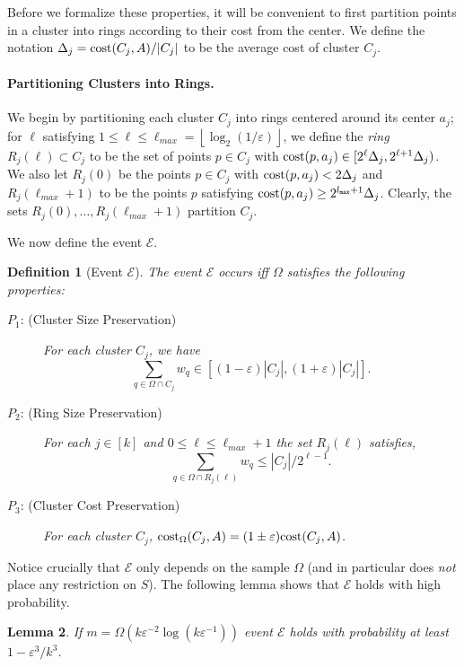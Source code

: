\documentclass[11pt]{article}
\newtheorem{lemma}{Lemma}[section]
\newtheorem{definition}[lemma]{Definition}
\theoremstyle{restate}
\theoremstyle{definition}
\newcommand{\eps}{\ensuremath{\varepsilon}}
\newcommand{\floor}[1]{{\left\lfloor{#1}\right\rfloor}}
\newcommand{\cost}{\textnormal{cost}}
\newcommand{\costom}{\cost_\Omega} %
\newcommand{\lmax}{l_\ensuremath{\textnormal{\texttt{max}}}}
\begin{document}
Before we formalize these properties, it will be convenient to first partition points in a cluster into rings according to their cost from the center. We define the notation $\Delta_j = \cost(C_j,A)/|C_j|$ to be the average cost of cluster $C_j$.

\paragraph{Partitioning Clusters into Rings.} We begin by partitioning each cluster $C_j$ into rings centered around its center $a_j$; for $\ell$ satisfying $1 \leq \ell \leq \ell_{max} =  \floor{\log_2(1/\eps)}$, we define the \textit{ring} $R_j(\ell)\subset C_j$ to be the set of points $p \in C_j$ with $\cost(p,a_j) \in [2^{\ell} \Delta_j, 2^{\ell+1} \Delta_j)$. We also let $R_j(0)$ be the points $p \in C_j$ with $\cost(p,a_j) < 2 \Delta_j$ and $R_j(\ell_{max}+1)$ to be the points $p$ satisfying $\cost(p,a_j) \geq 2^{\lmax + 1}\Delta_j$. Clearly, the sets $R_j(0), \ldots, R_j(\ell_{max} +1)$ partition $C_j$.  

We now define the event $\mathcal{E}$.
\begin{definition}[Event $\mathcal E$]
\label{def: event-E}
	The event $\mathcal E$ occurs iff $\Omega$ satisfies the following properties:
	\begin{description}
		\item[$P_1$: (Cluster Size Preservation)] \label{item: event-e-1}   For each cluster $C_j$, we have \[\sum_{q\in \Omega \cap C_j}w_q \in  [(1- \eps)|C_j|,(1+\eps)|C_j|].\]
	\item[$P_2$: (Ring Size Preservation)] \label{item: event-e-2}  For each $j \in [k]$ and $0 \leq \ell \leq \ell_{max}+1$ the set $R_j(\ell)$ satisfies, \[\sum_{q\in \Omega \cap R_j(\ell)}w_q \leq |C_j|/2^{\ell-1}.\]
    \item[$P_3$: (Cluster Cost Preservation)] For each cluster $C_j$, $\costom(C_j, A) = (1 \pm \eps) \cost(C_j, A)$.
	
	\end{description}
\end{definition}


Notice crucially that $\mathcal{E}$ only depends on the sample $\Omega$ (and in particular does \textit{not} place any restriction on $S$).
The following lemma shows that $\mathcal{E}$ holds with high probability. 
\begin{lemma}
\label{lem:E}
    If $m= \Omega(k\eps^{-2}\log (k \eps^{-1}))$ event $\mathcal{E}$ holds with probability at least $1-\eps^3/k^3$.
\end{lemma}
\end{document}
